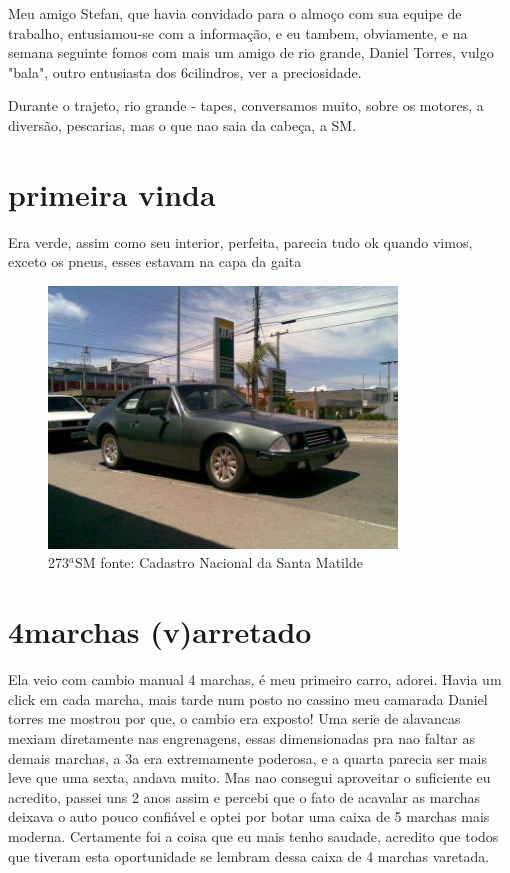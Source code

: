 \documentclass[a4paper]{report}
\begin{document}
Meu amigo Stefan, que havia convidado para o almo\c{c}o com sua equipe de trabalho, entusiamou-se com a informa\c{c}\~ao, e eu tambem, obviamente, e na semana 
seguinte fomos com mais um amigo de rio grande, Daniel Torres, vulgo "bala", outro entusiasta dos 6cilindros, ver a preciosidade.

Durante o trajeto, rio grande - tapes, conversamos muito, sobre os motores, a divers\~ao, pescarias, mas o que nao saia da cabe\c{c}a, a SM.   
\clearpage


\section*{primeira vinda}

Era verde, assim como seu interior, perfeita, parecia tudo ok quando vimos, exceto os pneus, esses estavam na capa da gaita

\begin{figure}[!htb]
\centering
\includegraphics{sm273}
\caption{273$^{a}$SM fonte: Cadastro Nacional da Santa Matilde}
\label{a 273a SM}
\end{figure}
\clearpage


\section*{4marchas (v)arretado}

Ela veio com cambio manual 4 marchas, \'e meu primeiro carro, adorei. Havia um click em cada marcha,
mais tarde num posto no cassino meu camarada Daniel torres me mostrou por que, o cambio era exposto!
Uma serie de alavancas mexiam diretamente nas engrenagens, essas dimensionadas pra nao faltar as demais 
marchas, a 3a era extremamente poderosa, e a quarta parecia ser mais leve que uma sexta, andava muito. 
Mas nao consegui aproveitar o suficiente eu acredito, passei uns 2 anos assim e percebi que o fato de 
acavalar as marchas deixava o auto pouco confi\'avel e optei por botar uma caixa de 5 marchas mais 
moderna.
Certamente foi a coisa que eu mais tenho saudade, acredito que todos que tiveram esta oportunidade 
se lembram dessa caixa de 4 marchas varetada.
\end{document}
